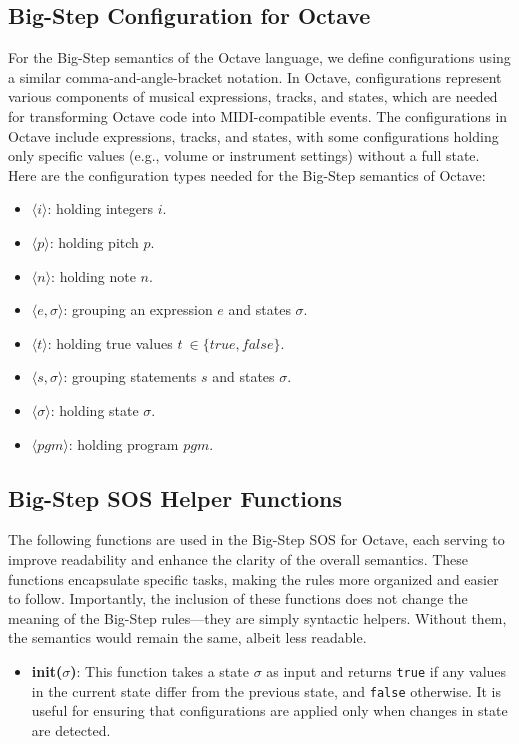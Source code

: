 \documentclass[letterpaper,12pt]{article}
\begin{document}
\subsection{Big-Step Configuration for Octave}
For the Big-Step semantics of the Octave language, we define configurations using a similar comma-and-angle-bracket notation. In Octave, configurations represent various components of musical expressions, tracks, and states, which are needed for transforming Octave code into MIDI-compatible events. The configurations in Octave include expressions, tracks, and states, with some configurations holding only specific values (e.g., volume or instrument settings) without a full state. Here are the configuration types needed for the Big-Step semantics of Octave:

\begin{itemize}    
    \item $\langle i \rangle$: holding integers $i$.
    
    \item $\langle p \rangle$: holding pitch $p$.

    \item $\langle n \rangle$: holding note $n$. 

    \item $\langle e, \sigma \rangle$: grouping an expression $e$ and states $\sigma$. 

    \item $\langle t \rangle$: holding true values $t\ \in \{true, false\}$.
    
    \item $\langle s, \sigma \rangle$: grouping statements $s$ and states $\sigma$. 
        
    \item $\langle \sigma \rangle$: holding state $\sigma$.

    \item $\langle pgm \rangle$: holding program $pgm$.
    
\end{itemize}

\subsection{Big-Step SOS Helper Functions}

The following functions are used in the Big-Step SOS for Octave, each serving to improve readability and enhance the clarity of the overall semantics. These functions encapsulate specific tasks, making the rules more organized and easier to follow. Importantly, the inclusion of these functions does not change the meaning of the Big-Step rules—they are simply syntactic helpers. Without them, the semantics would remain the same, albeit less readable.
\begin{itemize}
    \item \textbf{init($\sigma$)}: This function takes a state $\sigma$ as input and returns \texttt{true} if any values in the current state differ from the previous state, and \texttt{false} otherwise. It is useful for ensuring that configurations are applied only when changes in state are detected.
\end{itemize}
\end{document}
